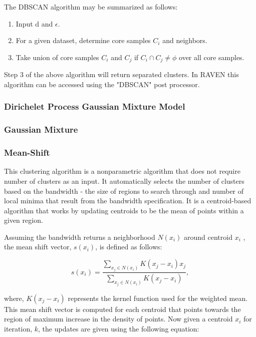 \documentclass[11pt]{article}
\begin{document}
The DBSCAN algorithm may be summarized as follows:

\begin{enumerate}

\item Input d and $\epsilon$.

\item For a given dataset, determine core samples $C_i$ and neighbors.  

\item Take union of core samples $C_i$ and $C_j$ if $C_i \cap C_j \neq \phi$ over all core samples. 


\end{enumerate}

Step 3 of the above algorithm will return separated clusters. In RAVEN this algorithm can be accessed using the "DBSCAN" post processor. 

\subsubsection{Dirichelet Process Gaussian Mixture Model}

\subsubsection{Gaussian Mixture}



\subsubsection{Mean-Shift} 

This clustering algorithm is a nonparametric algorithm that does not require number of clusters as an input. It automatically selects the number of clusters based on the bandwidth - the size of regions to search through and number of local minima that result from the bandwidth specification. It is a centroid-based algorithm that works by updating centroids to be the mean of points within a given region.  

Assuming the bandwidth returns a neighborhood $N(x_i)$ around centroid $x_i$ , the mean shift vector, $s(x_i)$, is defined as follows:

\begin{equation}
\label{ms_vec}
s(x_i) = \frac{\sum_{x_j \in N(x_i)} K(x_j - x_i) x_j}{\sum_{x_j \in N(x_i)} K(x_j - x_i) },
\end{equation}

where, $K(x_j - x_i)$ represents the kernel function used for the weighted mean. This mean shift vector is computed for each centroid that points towards the region of maximum increase in the density of points. Now given a centroid $x_i$ for iteration, $k$, the updates are given using the following equation: 
\end{document}
